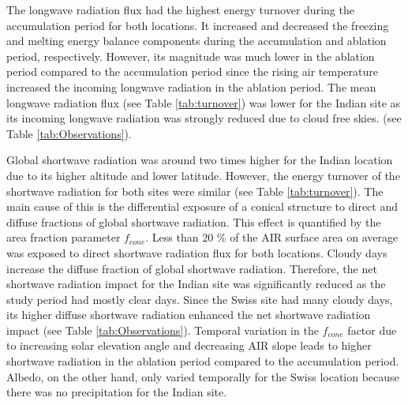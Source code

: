 \documentclass[utf8]{frontiersSCNS}
\begin{document}
The longwave radiation flux had the highest energy turnover during the accumulation period for both
locations. It increased and decreased the freezing and melting energy balance components during the accumulation
and ablation period, respectively. However, its magnitude was much lower in the ablation period compared to the
accumulation period since the rising air temperature increased the incoming longwave radiation in the ablation
period. The mean longwave radiation flux (see Table \ref{tab:turnover}) was lower for the Indian site as its incoming longwave
radiation was strongly reduced due to cloud free skies. (see Table \ref{tab:Observations}).

Global shortwave radiation was around two times higher for the Indian location due to its higher altitude and
lower latitude. However, the energy turnover of the shortwave radiation for both sites were similar (see Table
\ref{tab:turnover}). The main cause of this is the differential exposure of a conical structure to direct and
diffuse fractions of global shortwave radiation. This effect is quantified by the area fraction parameter
$f_{cone}$. Less than 20 \% of the AIR surface area on average was exposed to direct shortwave radiation flux
for both locations. Cloudy days increase the diffuse fraction of global shortwave radiation. Therefore, the net
shortwave radiation impact for the Indian site was significantly reduced as the study period had mostly clear
days. Since the Swiss site had many cloudy days, its higher diffuse shortwave radiation enhanced the net
shortwave radiation impact (see Table \ref{tab:Observations}). Temporal variation in the $f_{cone}$ factor due
to increasing solar elevation angle and decreasing AIR slope leads to higher shortwave radiation in the ablation
period compared to the accumulation period. Albedo, on the other hand, only varied temporally for the Swiss
location because there was no precipitation for the Indian site.
\end{document}
